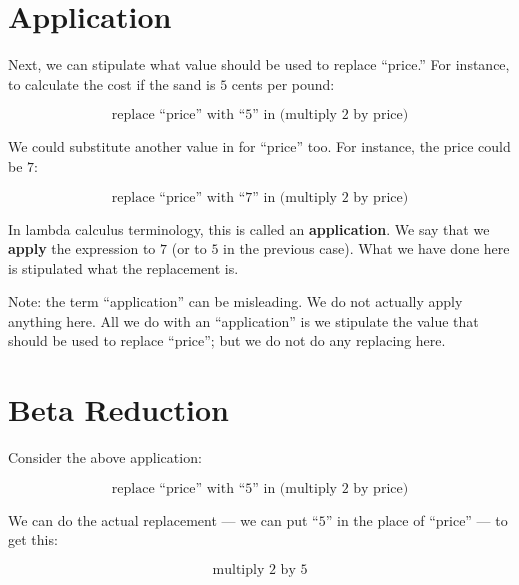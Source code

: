 \documentclass{book}
\numberwithin{equation}{chapter}
\newcommand{\vocab}{\textbf}
\begin{document}
\section{Application}

Next, we can stipulate what value should be used to replace ``price.'' For instance, to calculate the cost if the sand is $5$ cents per pound:

\begin{equation}
\text{replace ``price'' with ``$5$'' in (multiply 2 by price)}
\end{equation}

\noindent
We could substitute another value in for ``price'' too. For instance, the price could be $7$:

\begin{equation}
\text{replace ``price'' with ``$7$'' in (multiply 2 by price)}
\end{equation}

\noindent
In lambda calculus terminology, this is called an \vocab{application}. We say that we \vocab{apply} the expression to $7$ (or to $5$ in the previous case). What we have done here is stipulated what the replacement is.

Note: the term ``application'' can be misleading. We do not actually apply anything here. All we do with an ``application'' is we stipulate the value that should be used to replace ``price''; but we do not do any replacing here.


\section{Beta Reduction}

Consider the above application:

\begin{equation}
\text{replace ``price'' with ``$5$'' in (multiply 2 by price)}
\end{equation}

\noindent
We can do the actual replacement --- we can put ``$5$'' in the place of ``price'' --- to get this:

\begin{equation}
\text{multiply 2 by 5}
\end{equation}
\end{document}
